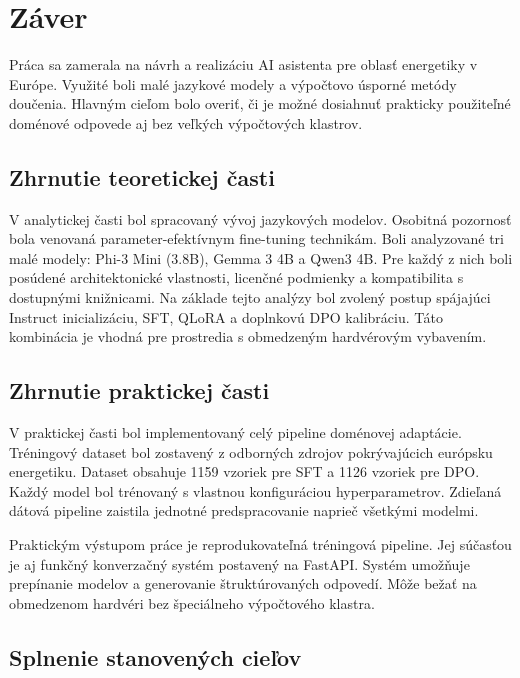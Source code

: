 
\chapter{Záver}\label{ch:summary}
 
Práca sa zamerala na návrh a realizáciu AI asistenta pre oblasť energetiky v Európe. Využité boli malé jazykové modely a výpočtovo úsporné metódy doučenia. Hlavným cieľom bolo overiť, či je možné dosiahnuť prakticky použiteľné doménové odpovede aj bez veľkých výpočtových klastrov.
 
\section*{Zhrnutie teoretickej časti}
 
V analytickej časti bol spracovaný vývoj jazykových modelov. Osobitná pozornosť bola venovaná parameter-efektívnym fine-tuning technikám. Boli analyzované tri malé modely: Phi-3 Mini (3.8B), Gemma 3 4B a Qwen3 4B. Pre každý z nich boli posúdené architektonické vlastnosti, licenčné podmienky a kompatibilita s dostupnými knižnicami. Na základe tejto analýzy bol zvolený postup spájajúci Instruct inicializáciu, SFT, QLoRA a doplnkovú DPO kalibráciu. Táto kombinácia je vhodná pre prostredia s obmedzeným hardvérovým vybavením.
 
\section*{Zhrnutie praktickej časti}
 
V praktickej časti bol implementovaný celý pipeline doménovej adaptácie. Tréningový dataset bol zostavený z odborných zdrojov pokrývajúcich európsku energetiku. Dataset obsahuje 1159 vzoriek pre SFT a 1126 vzoriek pre DPO. Každý model bol trénovaný s vlastnou konfiguráciou hyperparametrov. Zdieľaná dátová pipeline zaistila jednotné predspracovanie naprieč všetkými modelmi.
 
Praktickým výstupom práce je reprodukovateľná tréningová pipeline. Jej súčasťou je aj funkčný konverzačný systém postavený na FastAPI. Systém umožňuje prepínanie modelov a generovanie štruktúrovaných odpovedí. Môže bežať na obmedzenom hardvéri bez špeciálneho výpočtového klastra.
 
\section*{Splnenie stanovených cieľov}
 
